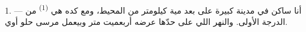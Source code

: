 %
%
%
%
%
%
%
%

\VUsaut{2.0mm}
\VUsaut{3.0mm}
\VUfilet{16mm}
\VUsaut{5.6mm}
\VUsaut{1.4mm}
\VUsaut{2.2mm}

\VUsaut{3.0mm}

1. --- أنا ساكن في مدينة كبيرة على بعد مية كيلومتر من المحيط، ومع كده هي
 \textsuperscript{(1)} من الدرجة الأولى. والنهر اللي على حدّها عرضه
أربعميت متر وبيعمل مرسى حلو أوي.

